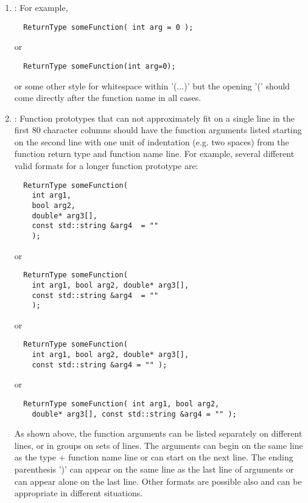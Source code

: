 \begin{enumerate}
\begin{enumerate}
  {}\item\FSCShortFunctionPrototypesOneLine: For example,

  {\small\begin{verbatim}
  ReturnType someFunction( int arg = 0 );
  \end{verbatim}}

  or 

  {\small\begin{verbatim}
  ReturnType someFunction(int arg=0);
  \end{verbatim}}

  or some other style for whitespace within '(...)' but the opening '(' should
  come directly after the function name in all cases.

  {}\item\FSCLongFunctionPrototypesIndent: Function prototypes that can not
  approximately fit on a single line in the first 80 character columns should
  have the function arguments listed starting on the second line with one unit
  of indentation (e.g. two spaces) from the function return type and function
  name line.  For example, several different valid formats for a longer
  function prototype are:

  {\small\begin{verbatim}
  ReturnType someFunction(
    int arg1,
    bool arg2,
    double* arg3[],
    const std::string &arg4  = ""
    );
  \end{verbatim}}
  
  or
  
  {\small\begin{verbatim}
  ReturnType someFunction(
    int arg1, bool arg2, double* arg3[],
    const std::string &arg4  = ""
    );
  \end{verbatim}}
  
  or
  
  {\small\begin{verbatim}
  ReturnType someFunction(
    int arg1, bool arg2, double* arg3[],
    const std::string &arg4 = "" );
  \end{verbatim}}
  
  or
  
  {\small\begin{verbatim}
  ReturnType someFunction( int arg1, bool arg2,
    double* arg3[], const std::string &arg4 = "" );
  \end{verbatim}}

  As shown above, the function arguments can be listed separately on different
  lines, or in groups on sets of lines.  The arguments can begin on the same
  line as the type + function name line or can start on the next line.  The
  ending parenthesis ')' can appear on the same line as the last line of
  arguments or can appear alone on the last line.  Other formats are possible
  also and can be appropriate in different situations.


\end{enumerate}
\end{enumerate}
